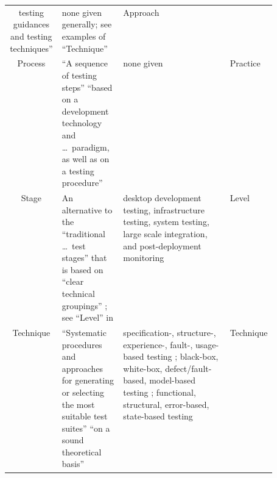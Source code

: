 \begin{table}[hbtp!]
\begin{tabularx}{\linewidth}{|c|X|m{0.4\linewidth}|>{\centering\arraybackslash}p{0.11\linewidth}|}
        testing guidances and testing techniques''
        \citep[p.~3]{BarbosaEtAl2006}          & none given
        generally; see examples of
        ``Technique''                          & Approach                                                     \\
        Process                                & ``A sequence of
        testing steps'' \citep[p.~2]{BarbosaEtAl2006} ``based on a development technology and \dots\
        paradigm, as well as on a testing procedure''
        \citetext{p.~3}                        & none given         & Practice                                \\
        Stage                                  & An
        alternative to the ``traditional \dots\ test stages'' that is based on
        ``clear technical groupings'' \citep[p.~13]{Gerrard2000a}; see ``Level'' in
        \Cref{tab:ieeeTestTerms}               & desktop
        development testing, infrastructure testing, system testing,
        large scale integration, and post-deployment monitoring
        \citep[p.~13]{Gerrard2000a}            & Level                                                        \\
        Technique                              & ``Systematic
        procedures and approaches for generating or selecting the most suitable test
        suites'' \citep[p.~5\=/10]{SWEBOK2024} ``on a sound theoretical basis''
        \citep[p.~3]{BarbosaEtAl2006}          & specification-,
        structure-, experience-, fault-, usage-based testing \citep[pp.~5\=/10, 5\=/13 to 5\=/15]{SWEBOK2024};
        black-box, white-box, defect/fault-based, model-based testing \citetext{\citealp[p.~3]{SouzaEtAl2017}; OG Mathur, 2012};
        functional, structural, error-based, state-based testing
        \citep[p.~3]{BarbosaEtAl2006}
                                               & Technique                                                    \\
        \hline
    \end{tabularx}
\end{table}